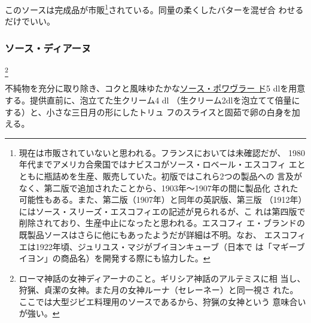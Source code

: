 \begin{recette}


このソースは完成品が市販\footnote{現在は市販されていないと思われる。フランスにおいては未確認だが、
  1980年代までアメリカ合衆国ではナビスコがソース・ロベール・エスコフィ
  エとともに瓶詰めを生産、販売していた。初版ではこれら2つの製品への
  言及がなく、第二版で追加されたことから、1903年〜1907年の間に製品化
  された可能性もある。また、第二版（1907年）と同年の英訳版、第三版
  （1912年）にはソース・スリーズ・エスコフィエの記述が見られるが、こ
  れは第四版で削除されており、生産中止になったと思われる。エスコフィ
  エ・ブランドの既製品ソースはさらに他にもあったようだが詳細は不明。なお、
  エスコフィエは1922年頃、ジュリユス・マジがブイヨンキューブ（日本で
  は「マギーブイヨン」の商品名）を開発する際にも協力した。}されている。同量の柔くしたバターを混ぜ合
わせるだけでいい。

\hypertarget{sauce-diane}{%
\subsubsection{ソース・ディアーヌ}\label{sauce-diane}}

\footnote{ローマ神話の女神ディアーナのこと。ギリシア神話のアルテミスに相
  当し、狩猟、貞潔の女神。また月の女神ルーナ（セレーネー）と同一視さ
  れた。ここでは大型ジビエ料理用のソースであるから、狩猟の女神という
  意味合いが強い。}

 

不純物を充分に取り除き、コクと風味ゆたかな\protect\hyperlink{sauce-poivrade}{ソース・ポワヴラー
ド}5 dlを用意する。提供直前に、泡立てた生クリーム4 dl
（生クリーム2dlを泡立てて倍量にする）と、小さな三日月の形にしたトリュ
フのスライスと固茹で卵の白身を加える。


\end{recette}
